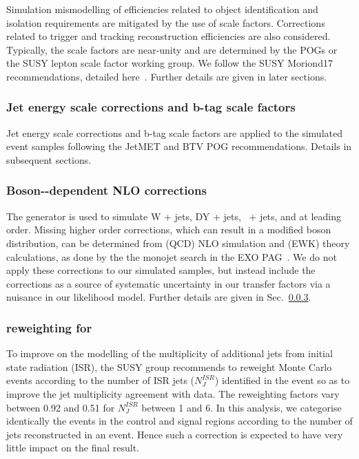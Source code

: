Simulation mismodelling of efficiencies related to object
identification and isolation requirements are mitigated by the use of
scale factors. Corrections related to trigger and tracking
reconstruction efficiencies are also considered. Typically, the scale
factors are near-unity and are determined by the POGs or the SUSY
lepton scale factor working group. We follow the SUSY Moriond17
recommendations, detailed here~\cite{susymoriond}. Further details
are given in later sections. 

\subsubsection{Jet energy scale corrections and b-tag scale factors}

Jet energy scale corrections and b-tag scale factors are applied to
the simulated event samples following the JetMET and BTV POG
recommendations. Details in subsequent sections. 

\subsubsection{Boson-\Pt-dependent NLO corrections}

The \MADGRAPH generator is used to simulate W + jets, DY + jets,
\znunu\ + jets, and \gj at leading order. Missing higher order
corrections, which can result in a modified boson \Pt distribution,
can be determined from (QCD) NLO simulation and (EWK) theory
calculations, as done by the the monojet search in the EXO
PAG~\cite{}. We do not apply these corrections to our simulated
samples, but instead include the corrections as a source of systematic
uncertainty in our transfer factors via a nuisance in our likelihood
model. Further details are given in Sec.~\ref{}.

\subsubsection{\nisr reweighting for \ttbar}

To improve on the \MADGRAPH modelling of the multiplicity of
additional jets from initial state radiation (ISR), the SUSY group
recommends to reweight \MADGRAPH \ttbar Monte Carlo events according
to the number of ISR jets ($N_J^{ISR}$) identified in the event so as
to improve the jet multiplicity agreement with data. The reweighting
factors vary between 0.92 and 0.51 for $N_J^{ISR}$ between 1 and 6. In
this analysis, we categorise identically the events in the control and
signal regions according to the number of jets reconstructed in an
event. Hence such a correction is expected to have very little impact
on the final result. 

